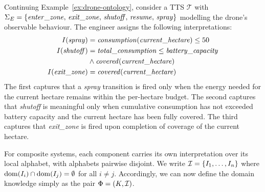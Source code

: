 \begin{example}
\label{ex:drone-interpretation}
Continuing Example~\ref{ex:drone-ontology}, 
consider a TTS $\mathcal{T}$ with $\Sigma_E = 
\{\mathit{enter\_zone},\, \mathit{exit\_zone},\, \mathit{shutoff},\, 
\mathit{resume},\, \mathit{spray}\}$ modelling the drone's observable 
behaviour. The engineer assigns the following interpretations:
\begin{align*}
I(\mathit{spray}) &= 
    \mathit{consumption}(\mathit{current\_hectare}) \leq 50 \\
I(\mathit{shutoff}) &= 
    \mathit{total\_consumption} 
    \leq \mathit{battery\_capacity}\\
    &\wedge 
    \mathit{covered}(\mathit{current\_hectare}) \\
I(\mathit{exit\_zone}) &= 
    \mathit{covered}(\mathit{current\_hectare})
\end{align*}
The first captures that a \emph{spray} transition is fired only when 
the energy needed for the current hectare remains within the per-hectare 
budget. The second captures that \emph{shutoff} is meaningful only when 
cumulative consumption has not exceeded battery capacity and the current 
hectare has been fully covered. The third captures that 
\emph{exit\_zone} is fired upon completion of coverage of the current 
hectare.
\end{example}

For composite systems, each component carries its own interpretation over its local alphabet, with alphabets pairwise disjoint. We write $\mathcal{I} = \{I_1, \ldots, I_n\}$ 
where $\mathrm{dom}(I_i) \cap \mathrm{dom}(I_j) 
= \emptyset$ for all $i \neq j$. Accordingly, we can now define the domain knowledge simply as the pair $\Phi = (K, \mathcal{I})$.



